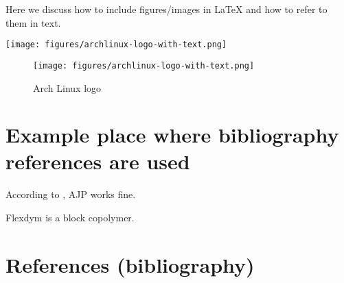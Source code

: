 \documentclass{article}
\begin{document}
    Here we discuss how to include figures/images in \LaTeX{} and how to refer to them in text.

    \begin{center}
      \texttt{[image: figures/archlinux-logo-with-text.png]}
    \end{center}


    \blindtext

  
    \begin{figure}[h]
      \begin{center}
        \texttt{[image: figures/archlinux-logo-with-text.png]}

        \caption{Arch Linux logo \label{ref_fig_archlogo}}
      \end{center}
    \end{figure}

  
  \section{Example place where bibliography references are used}

  According to \textcite{catic_aerosol-jet_2020}, AJP works fine. 

  Flexdym is a block copolymer. \parencite{lachaux_thermoplastic_2017}

  \section{References (bibliography)}

    \printbibliography
    
\end{document}
